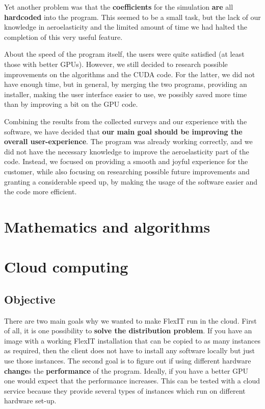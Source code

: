 \documentclass[a4paper, 11pt, article]{report}
\begin{document}
Yet another problem was that the \textbf{coefficients} for the simulation \textbf{are} all \textbf{hardcoded} into the program. This seemed to be a small task, but the lack of our knowledge in aeroelasticity and the limited amount of time we had halted the completion of this very useful feature.

About the speed of the program itself, the users were quite satisfied (at least those with better GPUs). However, we still decided to research possible improvements on the algorithms and the CUDA code. For the latter, we did not have enough time, but in general, by merging the two programs, providing an installer, making the user interface easier to use, we possibly saved more time than by improving a bit on the GPU code.

Combining the results from the collected surveys and our experience with the software, we have decided that \textbf{our main goal should be improving the overall user-experience}. The program was already working correctly, and we did not have the necessary knowledge to improve the aeroelasticity part of the code. Instead, we focused on providing a smooth and joyful experience for the customer, while also focusing on researching possible future improvements and granting a considerable speed up, by making the usage of the software easier and the code more efficient.

\section{Mathematics and algorithms}

\section{Cloud computing}

\subsection{Objective}

There are two main goals why we wanted to make FlexIT run in the cloud. First of all, it is one possibility to \textbf{solve the distribution problem}. If you have an image with a working FlexIT installation that can be copied to as many instances as required, then the client does not have to install any software locally but just use those instances. The second goal is to figure out if using different hardware \textbf{change}s the \textbf{performance} of the program. Ideally, if you have a better GPU one would expect that the performance increases. This can be tested with a cloud service because they provide several types of instances which run on different hardware set-up. 
\end{document}
